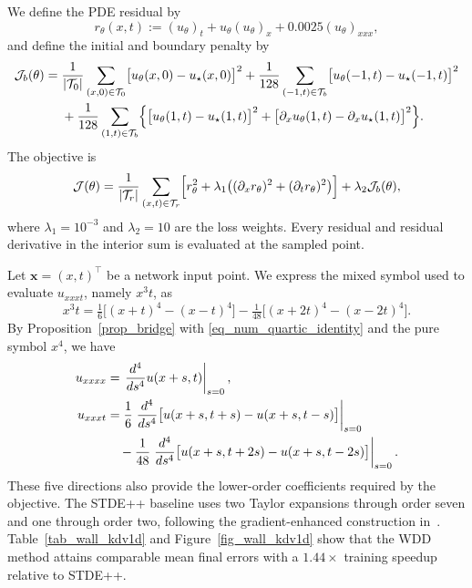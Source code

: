 \documentclass[final,oneeqnum]{siamltex}
\newcommand{\bx}{\bm{x}}
\begin{document}
We define the PDE residual by
\begin{equation*}
    r_\theta(x, t) := (u_\theta)_t + u_\theta (u_\theta)_x + 0.0025 (u_\theta)_{xxx},
\end{equation*}
and define the initial and boundary penalty by
\begin{align*}
    \mathcal J_b(\theta) = {} & \frac{1}{|\mathcal T_0|} \sum_{(x, 0) \in \mathcal T_0} \bigl[u_\theta(x, 0) - u_\star(x, 0)\bigr]^2 + \frac{1}{128} \sum_{(-1, t) \in \mathcal T_b} \bigl[u_\theta(-1, t) - u_\star(-1, t)\bigr]^2 \\
                              & + \frac{1}{128} \sum_{(1, t) \in \mathcal T_b} \Bigl\{\bigl[u_\theta(1, t) - u_\star(1, t)\bigr]^2 + \bigl[\partial_x u_\theta(1, t) - \partial_x u_\star(1, t)\bigr]^2\Bigr\}.
\end{align*}
The objective is
\begin{equation}\label{eq_num_gploss}
    \mathcal J(\theta) = \frac{1}{|\mathcal T_r|} \sum_{(x, t) \in \mathcal T_r} \Bigl[r_\theta^2 + \lambda_1 \bigl((\partial_x r_\theta)^2 + (\partial_t r_\theta)^2\bigr)\Bigr] + \lambda_2 \mathcal J_b(\theta),
\end{equation}
where $\lambda_1 = 10^{-3}$ and $\lambda_2 = 10$ are the loss weights.
Every residual and residual derivative in the interior sum is evaluated at the sampled point.

Let $\bx = (x, t)^\top$ be a network input point.
We express the mixed symbol used to evaluate $u_{xxxt}$, namely $x^3 t$, as
\begin{equation}\label{eq_num_quartic_identity}
    x^3 t = \tfrac{1}{6} \bigl[(x + t)^4 - (x - t)^4\bigr] - \tfrac{1}{48} \bigl[(x + 2 t)^4 - (x - 2 t)^4\bigr].
\end{equation}
By Proposition~\ref{prop_bridge} with \eqref{eq_num_quartic_identity} and the pure symbol $x^4$, we have
\begin{align}
    u_{xxxx} & = \left.\frac{d^4}{d s^4} u(x + s, t)\right|_{s = 0}, \label{eq_num_gkdv_reconstruction}                          \\
    u_{xxxt} & = \frac{1}{6} \left.\frac{d^4}{d s^4} \bigl[u(x + s, t + s) - u(x + s, t - s)\bigr]\right|_{s = 0} \notag           \\
             & \quad - \frac{1}{48} \left.\frac{d^4}{d s^4} \bigl[u(x + s, t + 2 s) - u(x + s, t - 2 s)\bigr]\right|_{s = 0}. \notag
\end{align}
These five directions also provide the lower-order coefficients required by the objective.
The STDE++ baseline uses two Taylor expansions through order seven and one through order two, following the gradient-enhanced construction in~\cite[Appendix~I.4]{Shi2026stdepp}.
Table~\ref{tab_wall_kdv1d} and Figure~\ref{fig_wall_kdv1d} show that the WDD method attains comparable mean final errors with a $1.44 \times$ training speedup relative to STDE++.
\end{document}
